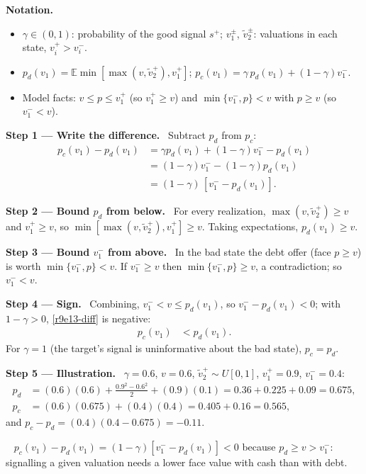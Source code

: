 \documentclass[11pt,a4paper]{article}
\newcommand{\notation}{\par\noindent\textbf{Notation.}}
\newcommand{\step}[2]{\par\medskip\noindent\textbf{Step #1 --- #2.}~}
\newcommand{\answer}[1]{\par\smallskip\noindent\fbox{\textbf{Answer #1.}}~}
\newcommand{\E}{\mathbb{E}}
\begin{document}
\notation
\begin{itemize}
  \item $\gamma\in(0,1)$: probability of the good signal $s^+$; $v_1^\pm$, $\tilde v_2^\pm$: valuations in each state, $v_i^+>v_i^-$.
  \item $p_d(v_1)=\E\min[\max(v,\tilde v_2^+),v_1^+]$; $p_c(v_1)=\gamma\,p_d(v_1)+(1-\gamma)v_1^-$.
  \item Model facts: $v\le p\le v_1^+$ (so $v_1^+\ge v$) and $\min\{v_1^-,p\}<v$ with $p\ge v$ (so $v_1^-<v$).
\end{itemize}

\step{1}{Write the difference} Subtract $p_d$ from $p_c$:
\begin{align}
  p_c(v_1)-p_d(v_1) &= \gamma p_d(v_1)+(1-\gamma)v_1^- - p_d(v_1) \nonumber\\
  &= (1-\gamma)v_1^- - (1-\gamma)p_d(v_1) \nonumber\\
  &= (1-\gamma)\,[v_1^- - p_d(v_1)]. \label{r9e13-diff}
\end{align}

\step{2}{Bound $p_d$ from below} For every realization, $\max(v,\tilde v_2^+)\ge v$ and $v_1^+\ge v$, so
$\min[\max(v,\tilde v_2^+),v_1^+]\ge v$. Taking expectations, $p_d(v_1)\ge v$.

\step{3}{Bound $v_1^-$ from above} In the bad state the debt offer (face $p\ge v$) is worth
$\min\{v_1^-,p\}<v$. If $v_1^-\ge v$ then $\min\{v_1^-,p\}\ge v$, a contradiction; so $v_1^-<v$.

\step{4}{Sign} Combining, $v_1^-<v\le p_d(v_1)$, so $v_1^--p_d(v_1)<0$; with $1-\gamma>0$,
\eqref{r9e13-diff} is negative:
\begin{align}
  p_c(v_1) &< p_d(v_1). \label{r9e13-res}
\end{align}
For $\gamma=1$ (the target's signal is uninformative about the bad state), $p_c=p_d$.

\step{5}{Illustration} $\gamma=0.6$, $v=0.6$, $\tilde v_2^+\sim U[0,1]$, $v_1^+=0.9$, $v_1^-=0.4$:
\begin{align}
  p_d &= (0.6)(0.6)+\frac{0.9^2-0.6^2}{2}+(0.9)(0.1) = 0.36+0.225+0.09=0.675, \nonumber\\
  p_c &= (0.6)(0.675)+(0.4)(0.4) = 0.405+0.16=0.565, \nonumber
\end{align}
and $p_c-p_d=(0.4)(0.4-0.675)=-0.11$.
\answer{(\#8)} $p_c(v_1)-p_d(v_1)=(1-\gamma)[v_1^--p_d(v_1)]<0$ because $p_d\ge v>v_1^-$: signalling a
given valuation needs a lower face value with cash than with debt.
\end{document}
